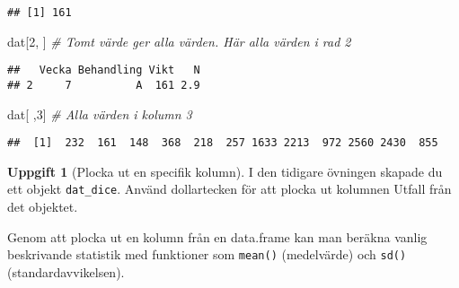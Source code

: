 \documentclass[
]{book}
\newenvironment{Shaded}{\begin{snugshade}}{\end{snugshade}}
\newcommand{\CommentTok}[1]{\textcolor[rgb]{0.56,0.35,0.01}{\textit{#1}}}
\newcommand{\DecValTok}[1]{\textcolor[rgb]{0.00,0.00,0.81}{#1}}
\newcommand{\FunctionTok}[1]{\textcolor[rgb]{0.00,0.00,0.00}{#1}}
\newcommand{\NormalTok}[1]{#1}
\newcommand{\SpecialCharTok}[1]{\textcolor[rgb]{0.00,0.00,0.00}{#1}}
\theoremstyle{definition}
\theoremstyle{definition}
\theoremstyle{definition}
\newtheorem{exercise}{Uppgift}[chapter]
\theoremstyle{definition}
\theoremstyle{remark}
\begin{document}
\begin{verbatim}
## [1] 161
\end{verbatim}

\begin{Shaded}
\begin{Highlighting}[]
\NormalTok{dat[}\DecValTok{2}\NormalTok{, ]           }\CommentTok{\# Tomt värde ger alla värden. Här alla värden i rad 2}
\end{Highlighting}
\end{Shaded}

\begin{verbatim}
##   Vecka Behandling Vikt   N
## 2     7          A  161 2.9
\end{verbatim}

\begin{Shaded}
\begin{Highlighting}[]
\NormalTok{dat[ ,}\DecValTok{3}\NormalTok{]           }\CommentTok{\# Alla värden i kolumn 3}
\end{Highlighting}
\end{Shaded}

\begin{verbatim}
##  [1]  232  161  148  368  218  257 1633 2213  972 2560 2430  855
\end{verbatim}

\begin{exercise}[Plocka ut en specifik kolumn]

I den tidigare övningen skapade du ett objekt \texttt{dat\_dice}. Använd dollartecken för att plocka ut kolumnen Utfall från det objektet.

\begin{Shaded}
\end{Shaded}

\end{exercise}

Genom att plocka ut en kolumn från en data.frame kan man beräkna vanlig beskrivande statistik med funktioner som \texttt{mean()} (medelvärde) och \texttt{sd()} (standardavvikelsen).

\begin{Shaded}
\end{Shaded}
\end{document}
